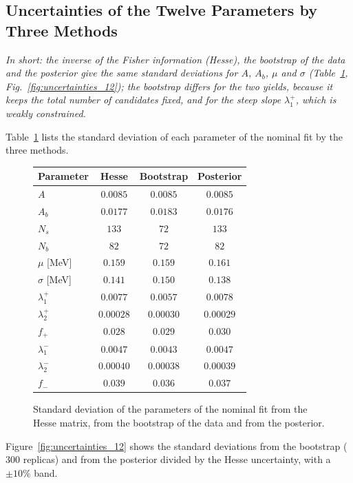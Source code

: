 \subsection{Uncertainties of the Twelve Parameters by Three Methods}
\label{sec:checks_covariance}
\emph{In short: the inverse of the Fisher information (Hesse), the bootstrap of the data and the posterior give the same standard deviations for $A$, $A_b$, $\mu$ and $\sigma$ (Table~\ref{tab:checks_covariance}, Fig.~\ref{fig:uncertainties_12}); the bootstrap differs for the two yields, because it keeps the total number of candidates fixed, and for the steep slope $\lambda_1^+$, which is weakly constrained.}

Table~\ref{tab:checks_covariance} lists the standard deviation of each parameter of the nominal fit by the three methods.

\begin{figure}[!t]
\makeatletter{}\makeatother
\centering
\begin{tabular}{lccc}
\toprule
Parameter & Hesse & Bootstrap & Posterior \\
\midrule
$A$ & $0.0085$ & $0.0085$ & $0.0085$ \\
$A_b$ & $0.0177$ & $0.0183$ & $0.0176$ \\
$N_s$ & $133$ & $72$ & $133$ \\
$N_b$ & $82$ & $72$ & $82$ \\
$\mu$ [MeV] & $0.159$ & $0.159$ & $0.161$ \\
$\sigma$ [MeV] & $0.141$ & $0.150$ & $0.138$ \\
$\lambda_1^+$ & $0.0077$ & $0.0057$ & $0.0078$ \\
$\lambda_2^+$ & $0.00028$ & $0.00030$ & $0.00029$ \\
$f_+$ & $0.028$ & $0.029$ & $0.030$ \\
$\lambda_1^-$ & $0.0047$ & $0.0043$ & $0.0047$ \\
$\lambda_2^-$ & $0.00040$ & $0.00038$ & $0.00039$ \\
$f_-$ & $0.039$ & $0.036$ & $0.037$ \\
\bottomrule
\end{tabular}
\caption{Standard deviation of the parameters of the nominal fit from the Hesse matrix, from the bootstrap of the data and from the posterior.}
\label{tab:checks_covariance}
\end{figure}

Figure~\ref{fig:uncertainties_12} shows the standard deviations from the bootstrap ($300$ replicas) and from the posterior divided by the Hesse uncertainty, with a $\pm10\%$ band.


